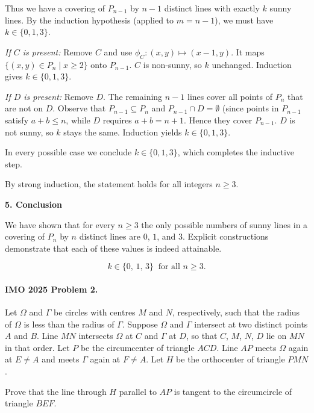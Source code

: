 \documentclass{llmxive}
\providecommand{\solutionheading}[1]{\par\smallskip\noindent\textbf{#1}\par}
\begin{document}
Thus we have a covering of \(P_{n-1}\) by \(n-1\) distinct lines with exactly \(k\) sunny lines. By the induction hypothesis (applied to \(m=n-1\)), we must have \(k \in \{0,1,3\}\).\par
\emph{If \(C\) is present:} Remove \(C\) and use \(\phi_C: (x,y) \mapsto (x-1, y)\). It maps \(\{(x,y)\in P_n \mid x\ge 2\}\) onto \(P_{n-1}\). \(C\) is non-sunny, so \(k\) unchanged. Induction gives \(k \in \{0,1,3\}\).\par
\emph{If \(D\) is present:} Remove \(D\). The remaining \(n-1\) lines cover all points of \(P_n\) that are not on \(D\). Observe that \(P_{n-1} \subseteq P_n\) and \(P_{n-1} \cap D = \emptyset\) (since points in \(P_{n-1}\) satisfy \(a+b\le n\), while \(D\) requires \(a+b = n+1\). Hence they cover \(P_{n-1}\). \(D\) is not sunny, so \(k\) stays the same. Induction yields \(k \in \{0,1,3\}\).\par
In every possible case we conclude \(k \in \{0,1,3\}\), which completes the inductive step.\par
By strong induction, the statement holds for all integers \(n \ge 3\).\par
\smallskip
\solutionheading{5. Conclusion}
We have shown that for every \(n \ge 3\) the only possible numbers of sunny lines in a covering of \(P_n\) by \(n\) distinct lines are \(0\), \(1\), and \(3\). Explicit constructions demonstrate that each of these values is indeed attainable.\par
\[
\boxed{k \in \{0,\,1,\,3\}\ \text{ for all } n\ge 3.}
\]
\par


\paragraph{IMO 2025 Problem 2.}
\begin{mdframed}[style=mdpurplebox,frametitle={IMO 2025 Problem 2}]
Let $\Omega$ and $\Gamma$ be circles with centres $M$ and $N$, respectively,
such that the radius of $\Omega$ is less than the radius of $\Gamma$.
Suppose $\Omega$ and $\Gamma$ intersect at two distinct points $A$ and $B$.
Line $MN$ intersects $\Omega$ at $C$ and $\Gamma$ at $D$,
so that $C$, $M$, $N$, $D$ lie on $MN$ in that order.
Let $P$ be the circumcenter of triangle $ACD$.
Line $AP$ meets $\Omega$ again at $E \neq A$ and meets $\Gamma$ again at $F \neq A$.
Let $H$ be the orthocenter of triangle $PMN$.

Prove that the line through $H$ parallel to $AP$ is tangent
to the circumcircle of triangle $BEF$.
\end{mdframed}
\end{document}
